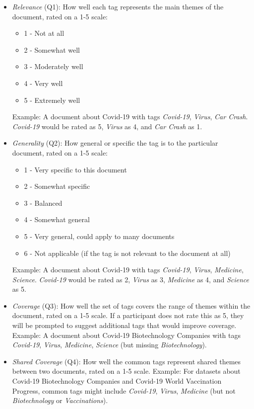 \begin{itemize}
\item \textit{Relevance} (Q1): How well each tag represents the main themes of the document, rated on a 1-5 scale:
\begin{itemize}
\item 1 - Not at all
\item 2 - Somewhat well
\item 3 - Moderately well
\item 4 - Very well
\item 5 - Extremely well
\end{itemize}
Example: A document about Covid-19 with tags \textit{Covid-19}, \textit{Virus}, \textit{Car Crash}. \textit{Covid-19} would be rated as 5, \textit{Virus} as 4, and \textit{Car Crash} as 1.

\item \textit{Generality} (Q2): How general or specific the tag is to the particular document, rated on a 1-5 scale:
\begin{itemize}
\item 1 - Very specific to this document
\item 2 - Somewhat specific
\item 3 - Balanced
\item 4 - Somewhat general
\item 5 - Very general, could apply to many documents
\item 6 - Not applicable (if the tag is not relevant to the document at all)
\end{itemize}
Example: A document about Covid-19 with tags \textit{Covid-19}, \textit{Virus}, \textit{Medicine}, \textit{Science}. \textit{Covid-19} would be rated as 2, \textit{Virus} as 3, \textit{Medicine} as 4, and \textit{Science} as 5.

\item \textit{Coverage} (Q3): How well the set of tags covers the range of themes within the document, rated on a 1-5 scale. If a participant does not rate this as 5, they will be prompted to suggest additional tags that would improve coverage.
Example: A document about Covid-19 Biotechnology Companies with tags \textit{Covid-19}, \textit{Virus}, \textit{Medicine}, \textit{Science} (but missing \textit{Biotechnology}).

\item \textit{Shared Coverage} (Q4): How well the common tags represent shared themes between two documents, rated on a 1-5 scale.
Example: For datasets about Covid-19 Biotechnology Companies and Covid-19 World Vaccination Progress, common tags might include \textit{Covid-19}, \textit{Virus}, \textit{Medicine} (but not \textit{Biotechnology} or \textit{Vaccinations}).
\end{itemize}

